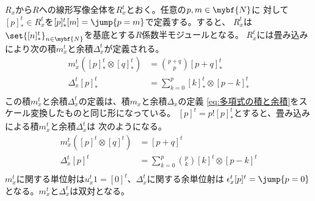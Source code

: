	$R_x$から$R$への線形写像全体を$R_x^t$とおく。任意の$p,m\in\mybf{N}$に
	対して$[p]^t_*\in R_x^t$を$[p]^t_*[m]=\jump{p=m}$で定義する。すると、
	$R_x^t$は$\set{[n]^t_*}_{n\in\mybf{N}}$を基底とする$R$係数半モジュールとなる。
	$R_x^t$には畳み込みにより次の積$m_x^t$と余積$\Delta_x^t$が定義される。
	\begin{equation}\begin{split} %
		m_x^t([p]^t_*\otimes [q]^t_*) &= \binom{p+q}{p}[p+q]^t_* \\
		\Delta_x^t[p]^t_* &= \sum_{k=0}^p[k]^t_*\otimes[p-k]^t_* \\
	\end{split}\end{equation} %
	この積$m_x^t$と余積$\Delta_x^t$の定義は、積$m_x$と余積$\Delta_x$の定義
	\eqref{eq:多項式の積と余積}をスケール変換したものと同じ形になっている。
	$[p]^t=p![p]^t_*$とすると、畳み込みによる積$m_x^t$と余積$\Delta_x^t$は
	次のようになる。
	\begin{equation}\begin{split} %
		m_x^t([p]^t\otimes [q]^t) &= [p+q]^t \\
		\Delta_x^t[p]^t &= \sum_{k=0}^p\binom{p}{k}[k]^t\otimes[p-k]^t \\
	\end{split}\end{equation} %
	$m_x^t$に関する単位射は$u_x^t1=[0]^t$、$\Delta_x^t$に関する余単位射は
	$\epsilon_x^t[p]^t=\jump{p=0}$となる。$m_x^t$と$\Delta_x^t$は双対となる。

